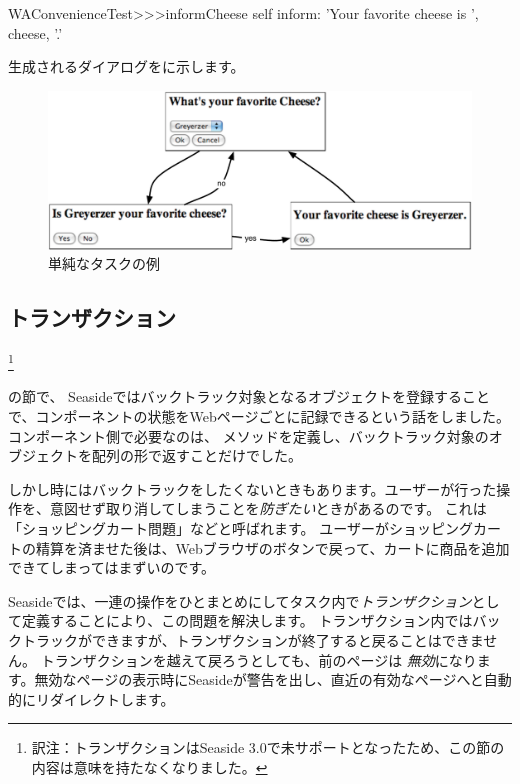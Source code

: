 \documentclass[a4paper,10pt,twoside]{book}
\begin{document}
\begin{code}{}
WAConvenienceTest>>>informCheese
	self inform: 'Your favorite cheese is ', cheese, '.'
\end{code}

生成されるダイアログをに示します。

\begin{figure}[ht]
\begin{center}
\includegraphics[width=\textwidth]{chooseCheese}
\caption{単純なタスクの例}
\end{center}
\end{figure}

\subsection{トランザクション}
\footnote{訳注：トランザクションはSeaside 3.0で未サポートとなったため、この節の内容は意味を持たなくなりました。}

 の節で、 Seasideではバックトラック対象となるオブジェクトを登録することで、コンポーネントの状態をWebページごとに記録できるという話をしました。
コンポーネント側で必要なのは、 メソッドを定義し、バックトラック対象のオブジェクトを配列の形で返すことだけでした。

しかし時にはバックトラックをしたくないときもあります。ユーザーが行った操作を、意図せず取り消してしまうことを\emph{防ぎたい}ときがあるのです。
これは「ショッピングカート問題」などと呼ばれます。
ユーザーがショッピングカートの精算を済ませた後は、Webブラウザのボタンで戻って、カートに商品を追加できてしまってはまずいのです。

Seasideでは、一連の操作をひとまとめにしてタスク内で\emph{トランザクション}として定義することにより、この問題を解決します。
トランザクション内ではバックトラックができますが、トランザクションが終了すると戻ることはできません。
トランザクションを越えて戻ろうとしても、前のページは \emph{無効}になります。無効なページの表示時にSeasideが警告を出し、直近の有効なページへと自動的にリダイレクトします。
\end{document}

